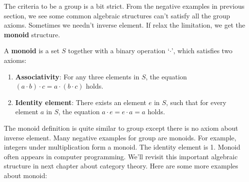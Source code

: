 \documentclass[b5paper]{article}
\begin{document}
The criteria to be a group is a bit strict. From the negative examples in previous section, we see some common algebraic structures can't satisfy all the group axioms. Sometimes we needn't inverse element. If relax the limitation, we get the \textbf{monoid} structure.

\begin{definition}
A \textbf{monoid} is a set $S$ together with a binary operation `$\cdot$', which satisfies two axioms:
\begin{enumerate}
\item \textbf{Associativity}: For any three elements in $S$, the equation $(a \cdot b) \cdot c = a \cdot (b \cdot c)$ holds.
\item \textbf{Identity element}: There exists an element $e$ in $S$, such that for every element $a$ in $S$, the equation $a \cdot e = e \cdot a = a$ holds.
\end{enumerate}
\end{definition}

The monoid definition is quite similar to group except there is no axiom about inverse element. Many negative examples for group are monoids. For example, integers under multiplication form a monoid. The identity element is 1. Monoid often appears in computer programming. We'll revisit this important algebraic structure in next chapter about category theory. Here are some more examples about monoid:
\end{document}
